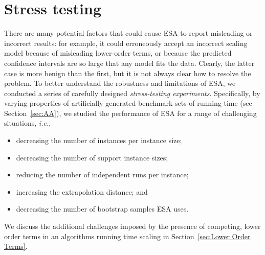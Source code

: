 \documentclass[aic]{iosart2x}
\newcommand{\ie}{\emph{i.e.}}
\begin{document}
\section{Stress testing}
\label{sec:Stress Testing}

There are many potential factors that could cause ESA to report misleading or incorrect results: for example, it could erroneously accept an incorrect scaling model because of misleading lower-order terms, or because the predicted confidence intervals are so large that any model fits the data. 
Clearly, the latter case is more benign than the first, but it is not always clear how to resolve the problem. 
To better understand the robustness and limitations of ESA, we conducted a series of carefully designed \emph{stress-testing experiments}.
Specifically, by varying properties of artificially generated benchmark sets of running time (see Section~\ref{sec:AA}), we studied the performance of ESA for a range of challenging situations, \ie{},
\begin{itemize}
    \item decreasing the number of instances per instance size;
    \item decreasing the number of support instance sizes;
    \item reducing the number of independent runs per instance;
    \item increasing the extrapolation distance; and
    \item decreasing the number of bootstrap samples ESA uses.
\end{itemize}
We discuss the additional challenges imposed by the presence of competing, lower order terms in an algorithms running time scaling in Section~\ref{sec:Lower Order Terms}.

\end{document}
